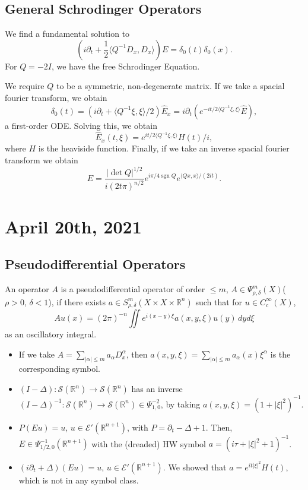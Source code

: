 \documentclass[12pt]{scrartcl}
\newcommand{\R}{\mathbb{R}}
\renewcommand{\hat}{\widehat}
\newcommand{\<}{\langle}
\renewcommand{\>}{\rangle}
\let \mc \mathcal
\begin{document}
\subsection{General Schrodinger Operators}
We find a fundamental solution to 
$$(i\partial_t + \frac{1}{2} \<Q^{-1}D_x, D_x\>)E = \delta_0(t) \delta_0(x).$$
For $Q = -2I$, we have the free Schrodinger Equation.

We require $Q$ to be a symmetric, non-degenerate matrix.  If we take a spacial fourier transform, we obtain
$$\delta_0(t) = (i \partial_t + \<Q^{-1}\xi, \xi\>/2)\hat{E}_x = i\partial_t (e^{-it/2\<Q^{-1}\xi, \xi\>} \hat{E}),$$
a first-order ODE.  Solving this, we obtain
$$\hat{E}_x(t, \xi) = e^{it/2 \<Q^{-1}\xi, \xi\>}H(t)/i,$$
where $H$ is the heaviside function.  Finally, if we take an inverse spacial fourier transform we obtain
$$E = \frac{|\det Q|^{1/2}}{i(2t \pi)^{n/2}}e^{i\pi/4 \operatorname{sgn}{Q}} e^{\<Qx, x\>/(2it)}.$$
\pagebreak
\section{April 20th, 2021}
\subsection{Pseudodifferential Operators}
\begin{definition} An operator $A$ is a pseudodifferential operator of order $\le m$, $A \in \Psi_{\rho, \delta}^m(X)$($\rho > 0$, $\delta < 1$), if there exists $a \in S_{\rho, \delta}^m(X \times X \times \R^n)$ such that for $u \in C_c^\infty(X)$,
$$Au(x) = (2\pi)^{-n} \iint e^{i(x - y) \xi} a(x, y, \xi) u(y) \,dy d\xi$$
as an oscillatory integral.

\end{definition}

\begin{itemize}
\item If we take $A = \sum_{|\alpha| \le m} a_\alpha D_x^\alpha$, then $a(x, y, \xi) = \sum_{|\alpha| \le m} a_\alpha(x)\xi^\alpha$ is the corresponding symbol.  
\item $(I - \Delta): \mc S(\R^n) \to \mc S(\R^n)$ has an inverse $(I - \Delta)^{-1}: \mc S (\R^n) \to \mc S(\R^n) \in \Psi_{1, 0}^{-2}$, by taking $a(x, y, \xi) = (1 + |\xi|^2)^{-1}$.
\item $P(Eu) = u$, $u \in \mc E'(\R^{n+1})$, with $P = \partial_t - \Delta + 1$.  Then, $E \in \Psi_{1/2, 0}^{-1}(\R^{n+1})$ with the (dreaded) HW symbol $a = (i\tau + |\xi|^2 + 1)^{-1}$.
\item $(i \partial_t + \Delta)(Eu) = u$, $u \in \mc E'(\R^{n+1})$.  We showed that $a = e^{it|\xi|^2}H(t)$, which is not in any symbol class.
 \end{itemize}
 
\end{document}
